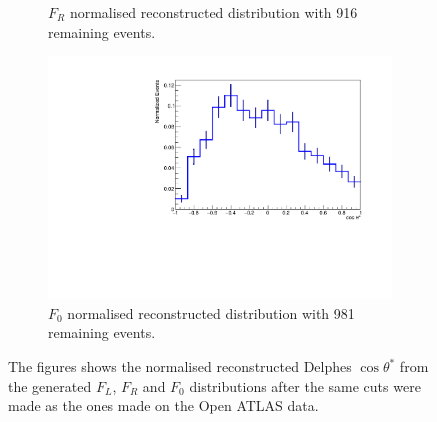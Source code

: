 \documentclass[12pt,a4paper]{article}
\numberwithin{equation}{section}
\begin{document}
\begin{figure}[H]
\begin{subfigure}[t]{0.47\textwidth}
    \caption{$F_R$ normalised reconstructed distribution with 916 remaining events.}
  \end{subfigure}
  \begin{subfigure}[t]{0.5\textwidth}
    \centering
    \includegraphics[width=1.1\textwidth]{figures/delphes_ctstar0}
    \caption{$F_0$ normalised reconstructed distribution with 981 remaining events.}
  \end{subfigure}
  \caption{The figures shows the normalised reconstructed Delphes $\cos \theta^*$ from the
    generated $F_L$, $F_R$ and $F_0$ distributions after the same cuts were made
    as the ones made on the Open ATLAS data.}\label{fig:redelphesdist}
\end{figure}
\end{document}
